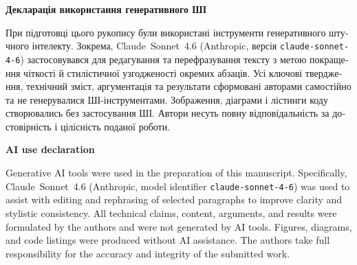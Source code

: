 
\medskip
\noindent\textbf{\foreignlanguage{ukrainian}{Декларація використання генеративного ШІ}}

\begin{otherlanguage}{ukrainian}
При підготовці цього рукопису були використані інструменти генеративного штучного інтелекту.
Зокрема, Claude~Sonnet~4.6 (Anthropic, версія \texttt{claude-sonnet-4-6}) застосовувався
для редагування та перефразування тексту з метою покращення чіткості й стилістичної
узгодженості окремих абзаців.
Усі ключові твердження, технічний зміст, аргументація та результати сформовані авторами
самостійно та не генерувалися ШІ-інструментами.
Зображення, діаграми і лістинги коду створювались без застосування ШІ.
Автори несуть повну відповідальність за достовірність і цілісність поданої роботи.
\end{otherlanguage}

\medskip
\noindent\textbf{AI use declaration}

Generative AI tools were used in the preparation of this manuscript.
Specifically, Claude~Sonnet~4.6 (\mbox{Anthropic}, model identifier \texttt{claude-sonnet-4-6})
was used to assist with editing and rephrasing of selected paragraphs to improve
clarity and stylistic consistency.
All technical claims, content, arguments, and results were formulated by the authors
and were not generated by AI tools.
Figures, diagrams, and code listings were produced without AI assistance.
The authors take full responsibility for the accuracy and integrity of the submitted work.
